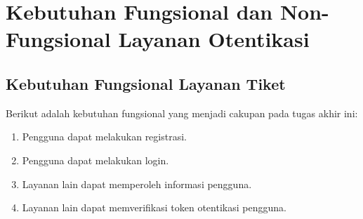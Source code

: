 \section{Kebutuhan Fungsional dan Non-Fungsional Layanan Otentikasi}

\subsection{Kebutuhan Fungsional Layanan Tiket}

Berikut adalah kebutuhan fungsional yang menjadi cakupan pada tugas akhir ini:

\begin{enumerate}
    \item Pengguna dapat melakukan registrasi.
    \item Pengguna dapat melakukan login.
    \item Layanan lain dapat memperoleh informasi pengguna.
    \item Layanan lain dapat memverifikasi token otentikasi pengguna.
\end{enumerate}
